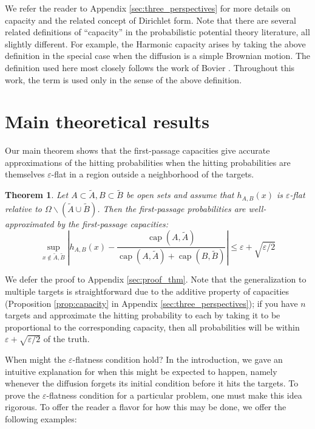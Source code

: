 \documentclass[12pt, nofootinbib,english, amsmath, amssymb, aps, priprint, graphicx,floatfix,draft]{revtex4-1}
\newtheorem{theorem}{Theorem}
\theoremstyle{plain}
\theoremstyle{definition}
\theoremstyle{plain}
\newcommand{\capac}[2]{\ensuremath{\operatorname{cap}}(#1,#2)}
\begin{document}
We refer the reader to Appendix \ref{sec:three_perspectives} for more details on capacity and the related concept of Dirichlet form.  Note that there are several related definitions of ``capacity'' in the probabilistic potential theory literature, all slightly different.  For example, the Harmonic capacity arises by taking the above definition in the special case when the diffusion is a simple Brownian motion.  The definition used here most closely follows the work of Bovier \cite{Bovier2016-ez,Bovier2004-wj}.  Throughout this work, the term is used only in the sense of the above definition.

\section{Main theoretical results}
\label{sec:MainResults}

Our main theorem shows that the first-passage capacities give accurate approximations of the hitting probabilities when the hitting probabilities are themselves $\varepsilon$-flat in a region outside a neighborhood of the targets.

\begin{theorem}\label{thm:main_thm}
Let $A\subset \tilde A,B\subset \tilde B$ be open sets and assume that  $h_{A,B}(x)$ is $\varepsilon$-flat relative to
$\Omega \backslash (\tilde A \cup \tilde B)$.
Then the first-passage probabilities are well-approximated by the first-passage capacities:
\[ \sup_{x \notin \tilde A,\tilde B} \left| h_{A,B} (x) - \frac{\capac{A}{\tilde A}}{\capac{A}{\tilde A}+\capac{B}{\tilde B}} \right| \leqslant \varepsilon + \sqrt{\varepsilon/2} \]
\end{theorem}

We defer the proof to Appendix \ref{sec:proof_thm}.  Note that the generalization to multiple targets is straightforward due to the additive property of capacities (Proposition \ref{prop:capacity} in Appendix \ref{sec:three_perspectives}); if you have $n$ targets and approximate the hitting probability to each by taking it to be proportional to the corresponding capacity, then all probabilities will be within $\varepsilon+\sqrt{\varepsilon/2}$ of the truth.

When might the $\varepsilon$-flatness condition hold?  In the introduction, we gave an intuitive explanation for when this might be expected to happen, namely whenever the diffusion forgets its initial condition before it hits the targets.  To prove the $\varepsilon$-flatness condition for a particular problem, one must make this idea rigorous.  To offer the reader a flavor for how this may be done, we offer the following examples:
\end{document}

